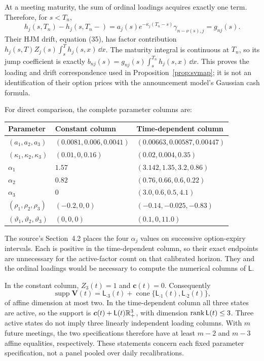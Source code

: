 At a meeting maturity, the sum of ordinal loadings acquires exactly one term. Therefore, for $s<T_n$,
\[
h_j(s,T_n)-h_j(s,T_n-)
=a_j(s)e^{-\kappa_j(T_n-s)}\gamma_{n-\nu(s),j}=g_{nj}(s).
\]
Their HJM drift, equation (35), has factor contribution
$h_j(s,T)Z_j(s)\int_s^T h_j(s,x)\,\dd x$.
The maturity integral is continuous at $T_n$, so its jump coefficient is exactly
$b_{nj}(s)=g_{nj}(s)\int_s^{T_n}h_j(s,x)\,\dd x$.
This proves the loading and drift correspondence used in Proposition~\ref{prop:svmap}; it is not an identification of their option prices with the announcement model's Gaussian cash formula.

For direct comparison, the complete parameter columns are:
\begin{center}\small
\begin{tabular}{lll}
\toprule
Parameter & Constant column & Time-dependent column\\
\midrule
$(a_1,a_2,a_3)$ & $(0.0081,0.006,0.0041)$ & $(0.00663,0.00587,0.00447)$\\
$(\kappa_1,\kappa_2,\kappa_3)$ & $(0.01,0,0.16)$ & $(0.02,0.004,0.35)$\\
$\alpha_1$ & $1.57$ & $(3.142,1.35,3.2,0.86)$\\
$\alpha_2$ & $0.82$ & $(0.76,0.66,0.6,0.22)$\\
$\alpha_3$ & $0$ & $(3.0,0.6,0.5,4.1)$\\
$(\rho_1,\rho_2,\rho_3)$ & $(-0.2,0,0)$ & $(-0.14,-0.025,-0.83)$\\
$(\vartheta_1,\vartheta_2,\vartheta_3)$ & $(0,0,0)$ & $(0.1,0,11.0)$\\
\bottomrule
\end{tabular}
\end{center}
The source's Section~4.2 places the four $\alpha_j$ values on successive option-expiry intervals. Each is positive in the time-dependent column, so their exact endpoints are unnecessary for the active-factor count on that calibrated horizon. They and the ordinal loadings would be necessary to compute the numerical columns of $\mathsf L$.

In the constant column, $Z_3(t)=1$ and $\boldsymbol c(t)=0$. Consequently
\[
\operatorname{supp}\boldsymbol V(t)=\mathsf L_{\cdot3}(t)
 +\operatorname{cone}\{\mathsf L_{\cdot1}(t),\mathsf L_{\cdot2}(t)\},
\]
of affine dimension at most two. In the time-dependent column all three states are active, so the support is $\boldsymbol c(t)+\mathsf L(t)\mathbb R_+^3$, with dimension $\operatorname{rank}\mathsf L(t)\leq3$. Three active states do not imply three linearly independent loading columns. With $m$ future meetings, the two specifications therefore have at least $m-2$ and $m-3$ affine equalities, respectively. These statements concern each fixed parameter specification, not a panel pooled over daily recalibrations.
